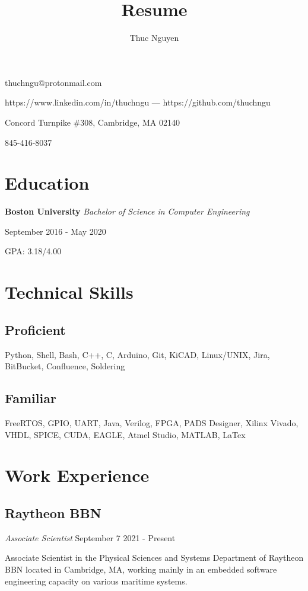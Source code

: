 \documentclass{article}
\makeatletter
\renewcommand{\maketitle}
{\begin{center}
{\huge\bfseries\theauthor}
\vspace{.5em}

thuchngu@protonmail.com

https://www.linkedin.com/in/thuchngu --- https://github.com/thuchngu

\end{center}}
\makeatother
\begin{document}
\title{Resume}
\author{Thuc Nguyen}
\maketitle
\vspace{-.5em}
{ Concord Turnpike \#308, Cambridge, MA 02140

845-416-8037

}
\vspace{-1.5em}
\section{Education}
\textbf{Boston University}  \textit{Bachelor of Science in Computer Engineering}

September 2016 - May 2020

GPA: 3.18/4.00

\vspace{-.75em}
\section{Technical Skills}
\subsection{Proficient}
Python, Shell, Bash, C++, C, Arduino, Git, KiCAD, Linux/UNIX, Jira, BitBucket, Confluence, Soldering
\vspace{-.75em}
\subsection{Familiar}
FreeRTOS, GPIO, UART, Java, Verilog, FPGA, PADS Designer, Xilinx Vivado, VHDL, SPICE, CUDA, EAGLE, Atmel Studio, MATLAB, LaTex

\vspace{-.75em}
\section{Work Experience}
\subsection{Raytheon BBN} \textit{Associate Scientist}
  September 7 2021 - Present

Associate Scientist in the Physical Sciences and Systems Department of Raytheon BBN located in Cambridge, MA, working mainly in an embedded software engineering capacity on various maritime systems.
\vspace{-.75em}
\end{document}
